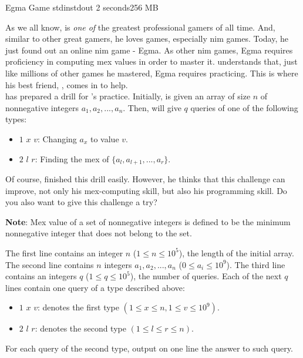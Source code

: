 \begin{problem}{Egma Game}
{stdin}{stdout}
{2 seconds}{256 MB}{}

As we all know, \TiChuot is \textit{one of} the greatest professional gamers of all time. And, similar to other great gamers, he loves games,
especially nim games. Today, he just found out an online nim game - Egma. As other nim games, Egma requires proficiency in computing mex values
in order to master it. \TiChuot understands that, just like millions of other games he mastered, Egma requires practicing. This is where his
best friend, \T, comes in to help.\\

\T has prepared a drill for \TiChuot's practice. Initially, \TiChuot is given an array of size $n$ of nonnegative integers $a_1, a_2, ..., a_n$.
Then, \T will give \TiChuot $q$ queries of one of the following types:
    \begin{itemize}
        \item
        $1$ $x$ $v$: Changing $a_x$ to value $v$.
        \item
        $2$ $l$ $r$: Finding the mex of $\{a_l, a_{l + 1}, ..., a_r\}$.
    \end{itemize}
Of course, \TiChuot finished this drill easily. However, he thinks that this challenge can improve, not only his mex-computing skill, but also
his programming skill. Do you also want to give this challenge a try?

\textbf{Note}: Mex value of a set of nonnegative integers is defined to be the minimum nonnegative integer that does not belong to the set.

\InputFile
The first line contains an integer $n$ ($1 \leq n \leq 10^5$), the length of the initial array. The second line contains $n$ integers $a_1, 
a_2, ..., a_n$ ($0 \leq a_i \leq 10^9$). The third line contains an integers $q$ ($1 \leq q \leq 10^5$), the number of queries. Each of the
next $q$ lines contain one query of a type described above:
    \begin{itemize}
        \item
        $1$ $x$ $v$: denotes the first type $(1 \leq x \leq n, 1 \leq v \leq 10^9)$.
        \item
        $2$ $l$ $r$: denotes the second type $(1 \leq l \leq r \leq n)$.
    \end{itemize}

\OutputFile

For each query of the second type, output on one line the answer to such query.

\Examples

\begin{example}
%
\end{example}

\end{problem}
